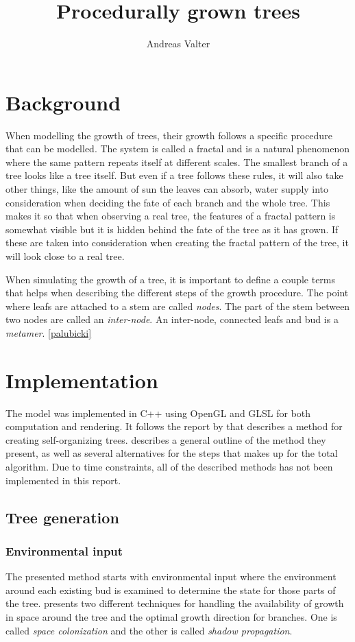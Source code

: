 \documentclass[11pt]{article} %
\title{Procedurally grown trees}
\author{Andreas Valter}
\begin{document}
\maketitle
\section{Background}
When modelling the growth of trees, their growth follows a specific procedure that can be modelled.
The system is called a fractal and is a natural phenomenon where the same pattern repeats itself at different scales.
The smallest branch of a tree looks like a tree itself.
But even if a tree follows these rules, it will also take other things, like the amount of sun the leaves can absorb, water supply into consideration when deciding the fate of each branch and the whole tree.
This makes it so that when observing a real tree, the features of a fractal pattern is somewhat visible but it is hidden behind the fate of the tree as it has grown.
If these are taken into consideration when creating the fractal pattern of the tree, it will look close to a real tree.

When simulating the growth of a tree, it is important to define a couple terms that helps when describing the different steps of the growth procedure.
The point where leafs are attached to a stem are called \emph{nodes}.
The part of the stem between two nodes are called an \emph{inter-node}.
An inter-node, connected leafs and bud is a \emph{metamer}.
\ref{palubicki}

\section{Implementation}
The model was implemented in C++ using OpenGL and GLSL for both computation and rendering.
It follows the report by \citet{palubicki} that describes a method for creating self-organizing trees.
\citet{palubicki} describes a general outline of the method they present, as well as several alternatives for the steps that makes up for the total algorithm.
Due to time constraints, all of the described methods has not been implemented in this report.

\subsection{Tree generation}


\subsubsection{Environmental input}
The presented method starts with environmental input where the environment around each existing bud is examined to determine the state for those parts of the tree.
\citet{palubicki} presents two different techniques for handling the availability of growth in space around the tree and the optimal growth direction for branches.
One is called \emph{space colonization} and the other is called \emph{shadow propagation}.
\end{document}
